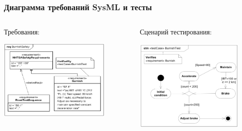 \documentclass{../../slides-style}
\begin{document}
    \begin{frame}
        \frametitle{Диаграмма требований SysML и тесты}
        \begin{columns}
            \begin{column}{0.5\textwidth}
                Требования:
                \begin{center}
                    \includegraphics[width=0.8\textwidth]{sysMlRequirementsTest.png}
                \end{center}
            \end{column}
            \begin{column}{0.5\textwidth}
                Сценарий тестирования:
                \begin{center}
                    \includegraphics[width=0.9\textwidth]{sysMlRequirementsTestActivity.png}
                \end{center}
            \end{column}
        \end{columns}
    \end{frame}
\end{document}
